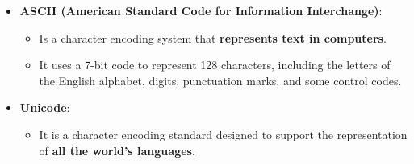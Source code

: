 

\begin{flushleft}
	
	\begin{itemize}
		\item \textbf{ASCII (American Standard Code for Information Interchange)}:
		\begin{itemize}
			\item Is a character encoding system that \textbf{represents text in computers}.
			\item It uses a 7-bit code to represent 128 characters, including the letters of the English alphabet, digits, punctuation marks, and some control codes.
			
		\end{itemize}
		
		\newpage
		
		\item \textbf{Unicode}:
		\begin{itemize}
			\item It is a character encoding standard designed to support the representation of \textbf{all the world's languages}.

		\end{itemize}  
				
	\end{itemize}
	
\end{flushleft}


